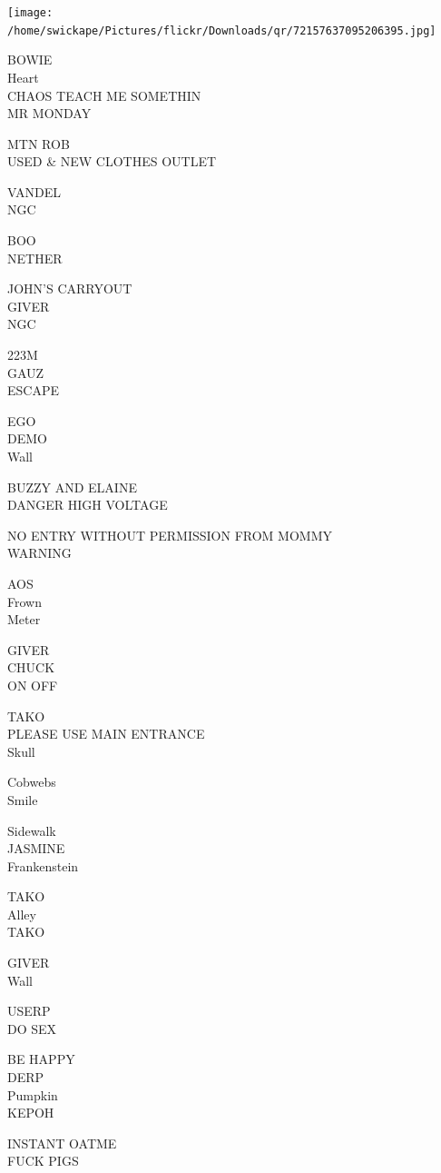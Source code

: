 \documentclass[10pt,letterpaper]{article}
\begin{document}
\texttt{[image: /home/swickape/Pictures/flickr/Downloads/qr/72157637095206395.jpg]}
\

BOWIE\\
Heart\\
CHAOS TEACH ME SOMETHIN\\
MR MONDAY

MTN ROB\\
USED \& NEW CLOTHES OUTLET

VANDEL\\
NGC

BOO\\
NETHER

JOHN'S CARRYOUT\\
GIVER\\
NGC

223M\\
GAUZ\\
ESCAPE

EGO\\
DEMO\\
Wall

BUZZY AND ELAINE\\
DANGER HIGH VOLTAGE

NO ENTRY WITHOUT PERMISSION FROM MOMMY\\
WARNING

AOS\\
Frown\\
Meter

GIVER\\
CHUCK\\
ON OFF

TAKO\\
PLEASE USE MAIN ENTRANCE\\
Skull

Cobwebs\\
Smile

Sidewalk\\
JASMINE\\
Frankenstein

TAKO\\
Alley\\
TAKO

GIVER\\
Wall

USERP\\
DO SEX

BE HAPPY\\
DERP\\
Pumpkin\\
KEPOH

INSTANT OATME\\
FUCK PIGS
\end{document}
